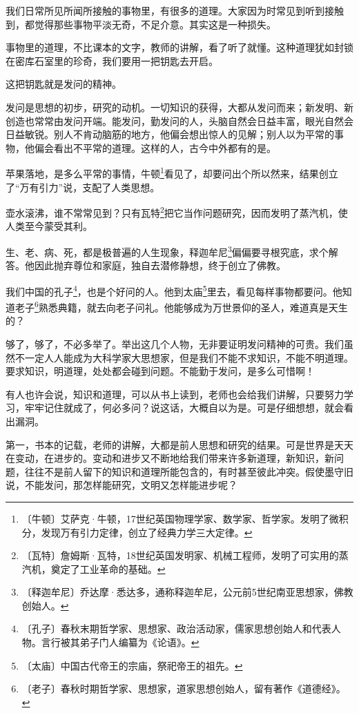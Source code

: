\documentclass[12pt,UTF-8,openany]{ctexbook}
\begin{document}
\begin{large}
    
    我们日常所见所闻所接触的事物里，有很多的道理。大家因为时常见到听到接触到，都觉得那些事物平淡无奇，不足介意。其实这是一种损失。
    
    事物里的道理，不比课本的文字，教师的讲解，看了听了就懂。这种道理犹如封锁在密库石室里的珍奇，我们要用一把钥匙去开启。
    
    这把钥匙就是发问的精神。
    
    发问是思想的初步，研究的动机。一切知识的获得，大都从发问而来；新发明、新创造也常常由发问开端。能发问，勤发问的人，头脑自然会日益丰富，眼光自然会日益敏锐。别人不肯动脑筋的地方，他偏会想出惊人的见解；别人以为平常的事物，他偏会看出不平常的道理。这样的人，古今中外都有的是。
    
    苹果落地，是多么平常的事情，牛顿\footnote{〔牛顿〕艾萨克·牛顿，17世纪英国物理学家、数学家、哲学家。发明了微积分，发现万有引力定律，创立了经典力学三大定律。}看见了，却要问出个所以然来，结果创立了“万有引力”说，支配了人类思想。
    
    壶水滚沸，谁不常常见到？只有瓦特\footnote{〔瓦特〕詹姆斯·瓦特，18世纪英国发明家、机械工程师，发明了可实用的蒸汽机，奠定了工业革命的基础。}把它当作问题研究，因而发明了蒸汽机，使人类至今蒙受其利。
    
    生、老、病、死，都是极普遍的人生现象，释迦牟尼\footnote{〔释迦牟尼〕乔达摩·悉达多，通称释迦牟尼，公元前5世纪南亚思想家，佛教创始人。}偏偏要寻根究底，求个解答。他因此抛弃尊位和家庭，独自去潜修静想，终于创立了佛教。
    
    我们中国的孔子\footnote{〔孔子〕春秋末期哲学家、思想家、政治活动家，儒家思想创始人和代表人物。言行被其弟子门人编纂为《论语》。}，也是个好问的人。他到太庙\footnote{〔太庙〕中国古代帝王的宗庙，祭祀帝王的祖先。}里去，看见每样事物都要问。他知道老子\footnote{〔老子〕春秋时期哲学家、思想家，道家思想创始人，留有著作《道德经》。}熟悉典籍，就去向老子问礼。他能够成为万世景仰的圣人，难道真是天生的？
    
    够了，够了，不必多举了。举出这几个人物，无非要证明发问精神的可贵。我们虽然不一定人人能成为大科学家大思想家，但是我们不能不求知识，不能不明道理。要求知识，明道理，处处都会碰到问题。不能勤于发问，是多么可惜啊！
    
    有人也许会说，知识和道理，可以从书上读到，老师也会给我们讲解，只要努力学习，牢牢记住就成了，何必多问？说这话，大概自以为是。可是仔细想想，就会看出漏洞。
    
    第一，书本的记载，老师的讲解，大都是前人思想和研究的结果。可是世界是天天在变动，在进步的。变动和进步又不断地给我们带来许多新道理，新知识，新问题，往往不是前人留下的知识和道理所能包含的，有时甚至彼此冲突。假使墨守旧说，不能发问，那怎样能研究，文明又怎样能进步呢？
    

\end{large}
\end{document}
